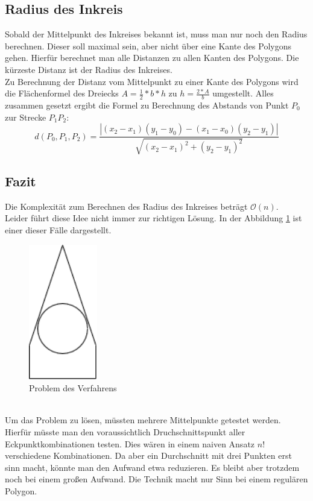 \documentclass[conference]{IEEEtran}
\begin{document}
	\subsection{Radius des Inkreis}
	Sobald der Mittelpunkt des Inkreises bekannt ist, muss man nur noch den Radius berechnen. Dieser soll maximal sein, aber nicht über eine Kante des Polygons gehen. Hierfür berechnet man alle Distanzen zu allen Kanten des Polygons. Die kürzeste Distanz ist der Radius des Inkreises.\\
	Zu Berechnung der Distanz vom Mittelpunkt zu einer Kante des Polygons wird die Flächenformel des Dreiecks $A = \frac{1}{2}*b*h$ zu $h=\frac{2*A}{b}$ umgestellt. 
	Alles zusammen gesetzt ergibt die Formel zu Berechnung des Abstands von Punkt $P_0$ zur Strecke $P_1P_2$:
	\[ d(P_0,P_1,P_2) = \frac{|(x_2-x_1)(y_1-y_0) - (x_1-x_0)(y_2-y_1)|}{\sqrt{(x_2-x_1)^2+(y_2-y_1)^2}} \]
	\subsection{Fazit}
	Die Komplexität zum Berechnen des Radius des Inkreises beträgt $\mathcal{O}(n)$.\\
	Leider führt diese Idee nicht immer zur richtigen Lösung. In der Abbildung \ref{fail} ist einer dieser Fälle dargestellt.\\
	\begin{figure}[h]
		\begin{center}
			\includegraphics[width=3cm]{CircleFail.png}
			\caption{Problem des Verfahrens}
			\label{fail}
		\end{center}
	\end{figure}\\
	Um das Problem zu lösen, müssten mehrere Mittelpunkte getestet werden. Hierfür müsste man den voraussichtlich Druchschnittspunkt aller Eckpunktkombinationen testen. Dies wären in einem naiven Ansatz $n!$ verschiedene Kombinationen. Da aber ein Durchschnitt mit drei Punkten erst sinn macht, könnte man den Aufwand etwa reduzieren. Es bleibt aber trotzdem noch bei einem großen Aufwand. Die Technik macht nur Sinn bei einem regulären Polygon.
	
\end{document}
